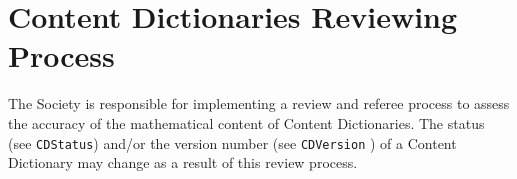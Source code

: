 \section{Content Dictionaries Reviewing Process}\label{cdapprove}

The \OM Society is responsible for implementing a review and referee process to assess the
accuracy of the mathematical content of Content Dictionaries.  The status (see
\lstinline|CDStatus|) and/or the version number (see \lstinline|CDVersion| ) of a
Content Dictionary may change as a result of this review process.

